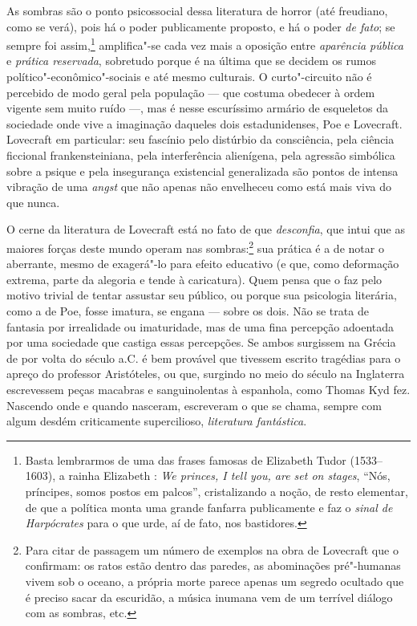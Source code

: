 As sombras são o ponto psicossocial dessa literatura de horror (até
freudiano, como se verá), pois há o poder publicamente proposto, e há o
poder \emph{de fato}; se sempre foi assim,\footnote{Basta lembrarmos de
  uma das frases famosas de Elizabeth Tudor (1533--1603), a rainha
  Elizabeth : \emph{We princes, I tell you, are set on stages}, ``Nós,
  príncipes, somos postos em palcos'', cristalizando a noção, de resto
  elementar, de que a política monta uma grande fanfarra publicamente e
  faz o \emph{sinal de Harpócrates} para o que urde, aí de fato, nos
  bastidores.} amplifica"-se cada vez mais a oposição entre
\emph{aparência pública} e \emph{prática reservada}, sobretudo porque é
na última que se decidem os rumos político"-econômico"-sociais e até mesmo
culturais. O curto"-circuito não é percebido de modo geral pela população
--- que costuma obedecer à ordem vigente sem muito ruído ---, mas é
nesse escuríssimo armário de esqueletos da sociedade onde vive a
imaginação daqueles dois estadunidenses, Poe e Lovecraft. Lovecraft em
particular: seu fascínio pelo distúrbio da consciência, pela ciência
ficcional frankensteiniana, pela interferência alienígena, pela agressão
simbólica sobre a psique e pela insegurança existencial generalizada são
pontos de intensa vibração de uma \emph{angst} que não apenas não
envelheceu como está mais viva do que nunca.

O cerne da literatura de Lovecraft está no fato de que \emph{desconfia},
que intui que as maiores forças deste mundo operam nas sombras:\footnote{Para
  citar de passagem um número de exemplos na obra de Lovecraft que o
  confirmam: os ratos estão dentro das paredes, as abominações
  pré"-humanas vivem sob o oceano, a própria morte parece apenas um
  segredo ocultado que é preciso sacar da escuridão, a música inumana
  vem de um terrível diálogo com as sombras, etc.} sua prática é a de
notar o aberrante, mesmo de exagerá"-lo para efeito educativo (e que,
como deformação extrema, parte da alegoria e tende à caricatura). Quem
pensa que o faz pelo motivo trivial de tentar assustar seu público, ou
porque sua psicologia literária, como a de Poe, fosse imatura, se engana
--- sobre os dois. Não se trata de fantasia por irrealidade ou
imaturidade, mas de uma fina percepção adoentada por uma sociedade que
castiga essas percepções. Se ambos surgissem na Grécia de por volta do
século  a.C. é bem provável que tivessem escrito tragédias para o
apreço do professor Aristóteles, ou que, surgindo no meio do século 
na Inglaterra escrevessem peças macabras e sanguinolentas à espanhola,
como Thomas Kyd fez. Nascendo onde e quando nasceram, escreveram o que
se chama, sempre com algum desdém criticamente supercilioso,
\emph{literatura fantástica}.


